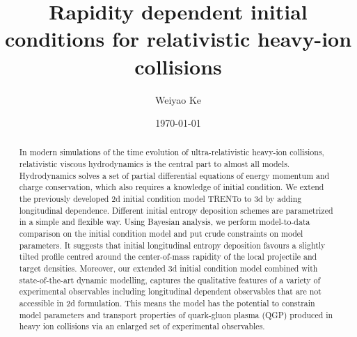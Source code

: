 \documentclass[aps,prl,twocolumn,groupedaddress]{revtex4-1}
\begin{document}

\title{Rapidity dependent initial conditions for relativistic heavy-ion collisions}


\author{Weiyao Ke}


\date{\today}

\begin{abstract}
In modern simulations of the time evolution of ultra-relativistic heavy-ion collisions, relativistic viscous hydrodynamics is the central part to almost all models. Hydrodynamics solves a set of partial differential equations of energy momentum and charge conservation, which also requires a knowledge of initial condition. We extend the previously developed 2d initial condition model TRENTo to 3d by adding longitudinal dependence. Different initial entropy deposition schemes are parametrized in a simple and flexible way. Using Bayesian analysis, we perform model-to-data comparison on the initial condition model and put crude constraints on model parameters. It suggests that initial longitudinal entropy deposition favours a slightly tilted profile centred around the center-of-mass rapidity of the local projectile and target densities. Moreover, our extended 3d initial condition model combined with state-of-the-art dynamic modelling, captures the qualitative features of a variety of experimental observables including longitudinal dependent observables that are not accessible in 2d formulation. This means the model has the potential to constrain model parameters and transport properties of quark-gluon plasma (QGP) produced in heavy ion collisions via an enlarged set of experimental observables.
\end{abstract}
\end{document}
